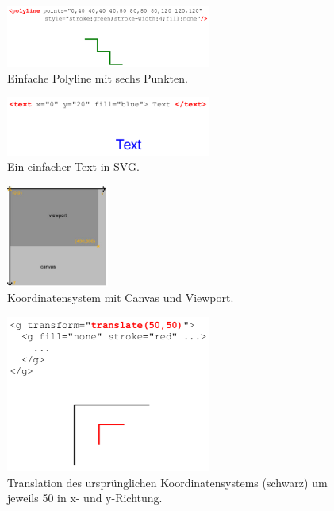 \begin{figure}[h!]\centering
\includegraphics[width=0.6\textwidth]{pictures/polyline.png}
\caption{Einfache Polyline mit sechs Punkten.}
\label{fig:polyl}\end{figure}
\begin{figure}[h!]\centering
\includegraphics[width=0.6\textwidth]{pictures/text.png}
\caption{Ein einfacher Text in SVG.}
\label{fig:text}\end{figure}
\begin{figure}[h!]\centering
\includegraphics[width=0.3\textwidth]{pictures/koordinatensystem.jpg}
\caption{Koordinatensystem mit Canvas und Viewport.}
\label{fig:koor}\end{figure}
\begin{figure}[h!]\centering
\includegraphics[width=0.6\textwidth]{pictures/transla.png}
\caption{Translation des ursprünglichen Koordinatensystems (schwarz) um jeweils 50 in x- und y-Richtung.}
\label{fig:trans}\end{figure}
